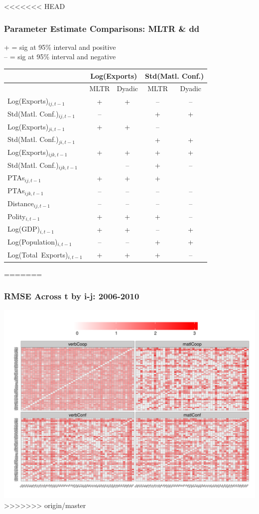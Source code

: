 \documentclass[10pt, compress]{beamer}
\begin{document}
\frame
{
<<<<<<< HEAD
  \frametitle{Parameter Estimate Comparisons: MLTR \& dd}
  \footnotesize{+ = sig at 95\% interval and positive} \\
  \footnotesize{--\; = sig at 95\% interval and negative}
  
  \centering
  \begin{tabular}{l | cc | cc}
~ & \multicolumn{2}{c}{Log(Exports)} & \multicolumn{2}{c}{Std(Matl. Conf.)} \\
\hline\hline
~ & MLTR & Dyadic & MLTR & Dyadic \\
\hline
  Log(Exports)$_{ij, t-1}$ & + & + & -- & -- \\
  Std(Matl. Conf.)$_{ij, t-1}$ & -- &  & + & + \\
  Log(Exports)$_{ji, t-1}$ & + & + & -- &  \\
  Std(Matl. Conf.)$_{ji, t-1}$ &  &  & + & + \\
  Log(Exports)$_{ijk, t-1}$ & + & + & + & + \\
  Std(Matl. Conf.)$_{ijk, t-1}$ &  & -- & + & -- \\
  PTAs$_{ij, t-1}$ & + & + & + &  \\
  PTAs$_{ijk, t-1}$ & -- & -- & -- & -- \\
  Distance$_{ij, t-1}$ & -- & -- & -- & -- \\
  Polity$_{i, t-1}$ & + & + & + & -- \\
  Log(GDP)$_{i, t-1}$ & + & + & -- & + \\
  Log(Population)$_{i, t-1}$ & -- & -- & + & + \\
  Log(Total~Exports)$_{i, t-1}$ & + & + & + & -- 
  \end{tabular}
=======
\frametitle{RMSE Across t by i-j: 2006-2010}
  \centering
  \vspace*{-.3in}
  \includegraphics[width=1\textwidth]{2006-2010_iperf.pdf}
>>>>>>> origin/master
}
\end{document}
